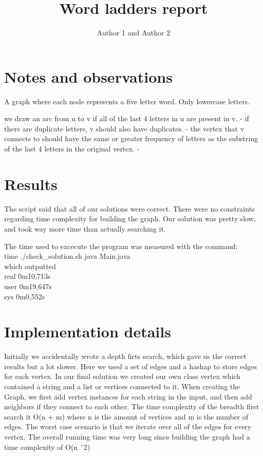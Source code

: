 \documentclass{article}
\title{Word ladders report}
\author{Author 1 and Author 2}
\begin{document}
  \maketitle

  \section{Notes and observations}
  A graph where each node represents a five letter word. Only lowercase letters.

  we draw an arc from u to v if all of the last 4 letters in u are present in v.
    - if there are duplicate letters, v should also have duplicates.
    - the vertex that v connects to should have the same or greater frequency of letters as the substring of the last 4 letters in the original vertex.
    - 

  \section{Results}

  The script said that all of our solutions were correct.
  There were no constraints regarding time complexity for building the graph. Our solution was pretty slow, and took way more time than actually searching it.

  The time used to excecute the program was measured with the command: \\
  time ./check\_solution.sh java Main.java \\


  which outputted \\
  real    0m10,713s \\
  user    0m19,647s\\
  sys     0m0,552s\\


  \section{Implementation details}
    Initially we accidentally wrote a depth firts search, which gave us the correct results but a lot slower. Here we used a set of edges and a hashap to store edges for each vertex.
    In our final solution we created our own class vertex which contained a string and a list or vertices connected to it. When creating the Graph, we first add vertex instances for each string in the input, and then add neighbors if they connect to each other.
    The time complexity of the breadth first search it O(n + m) where n is the amount of vertices and m is the number of edges.
    The worst case scenario is that we iterate over all of the edges for every vertex.
    The overall running time was very long since building the graph had a time complexity of O(n \^\ 2)
\end{document}
